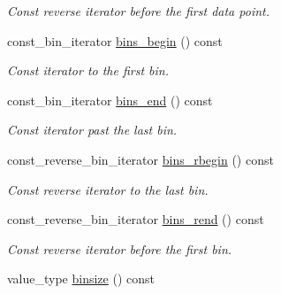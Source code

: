 \begin{DoxyCompactItemize}
\begin{DoxyCompactList}\small\item\em Const reverse iterator before the first data point. \end{DoxyCompactList}\item 
\hypertarget{a00284_a4ee0ac30f6fce5d43e518953397d7a52}{}const\+\_\+bin\+\_\+iterator \hyperlink{a00284_a4ee0ac30f6fce5d43e518953397d7a52}{bins\+\_\+begin} () const \label{a00284_a4ee0ac30f6fce5d43e518953397d7a52}

\begin{DoxyCompactList}\small\item\em Const iterator to the first bin. \end{DoxyCompactList}\item 
\hypertarget{a00284_ad2835094c088b316c772211c850dc415}{}const\+\_\+bin\+\_\+iterator \hyperlink{a00284_ad2835094c088b316c772211c850dc415}{bins\+\_\+end} () const \label{a00284_ad2835094c088b316c772211c850dc415}

\begin{DoxyCompactList}\small\item\em Const iterator past the last bin. \end{DoxyCompactList}\item 
\hypertarget{a00284_a30141b73bf05264cea359b1aea85de64}{}const\+\_\+reverse\+\_\+bin\+\_\+iterator \hyperlink{a00284_a30141b73bf05264cea359b1aea85de64}{bins\+\_\+rbegin} () const \label{a00284_a30141b73bf05264cea359b1aea85de64}

\begin{DoxyCompactList}\small\item\em Const reverse iterator to the last bin. \end{DoxyCompactList}\item 
\hypertarget{a00284_a8363835c38d2df6731d2b3cdbb6276ea}{}const\+\_\+reverse\+\_\+bin\+\_\+iterator \hyperlink{a00284_a8363835c38d2df6731d2b3cdbb6276ea}{bins\+\_\+rend} () const \label{a00284_a8363835c38d2df6731d2b3cdbb6276ea}

\begin{DoxyCompactList}\small\item\em Const reverse iterator before the first bin. \end{DoxyCompactList}\item 
\hypertarget{a00284_a1d97ebf605cbdbf9b78722d4d7617f94}{}value\+\_\+type \hyperlink{a00284_a1d97ebf605cbdbf9b78722d4d7617f94}{binsize} () const \label{a00284_a1d97ebf605cbdbf9b78722d4d7617f94}


\end{DoxyCompactItemize}
